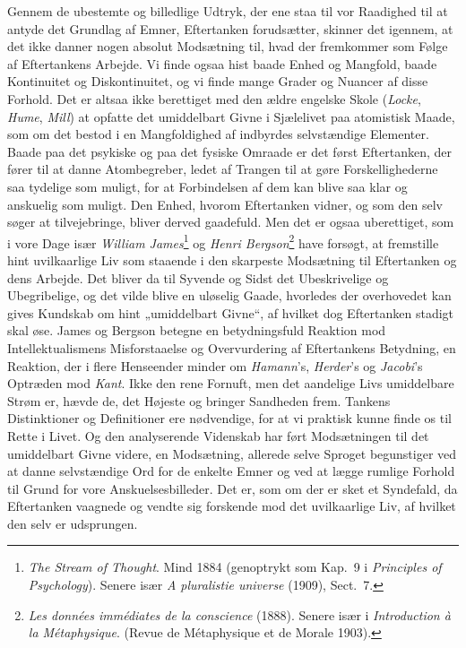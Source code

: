 \documentclass[12pt,a4paper]{book}
\newcommand{\apage}[1]{\marginnote{\footnotesize\textit{[#1]}}}
\begin{document}
\apage{8} Gennem de ubestemte og billedlige Udtryk, der ene staa til vor
Raadighed til at antyde det Grundlag af Emner, Eftertanken
forudsætter, skinner det igennem, at det ikke danner nogen absolut
Modsætning til, hvad der fremkommer som Følge af Eftertankens Arbejde.
Vi finde ogsaa hist baade Enhed og Mangfold, baade Kontinuitet og
Diskontinuitet, og vi finde mange Grader og Nuancer af disse Forhold.
Det er altsaa ikke berettiget med den ældre engelske Skole
(\emph{Locke}, \emph{Hume}, \emph{Mill}) at opfatte det umiddelbart
Givne i Sjælelivet paa atomistisk Maade, som om det bestod i en
Mangfoldighed af indbyrdes selvstændige Elementer. Baade paa det
psykiske og paa det fysiske Omraade er det først Eftertanken, der
fører til at danne Atombegreber, ledet af Trangen til at gøre
Forskellighederne saa tydelige som muligt, for at Forbindelsen af dem
kan blive saa klar og anskuelig som muligt. Den Enhed, hvorom
Eftertanken vidner, og som den selv søger at tilvejebringe, bliver
derved gaadefuld. Men det er ogsaa uberettiget, som i vore Dage især
\emph{William James}\footnote{\emph{The Stream of Thought}. Mind 1884
(genoptrykt som Kap.\ 9 i \emph{Principles of Psychology}). Senere
især \emph{A pluralistie universe} (1909), Sect.\ 7.} og \emph{Henri
Bergson}\footnote{\emph{Les données immédiates de la conscience}
(1888). Senere især i \emph{Introduction à la Métaphysique}. (Revue de
Métaphysique et de Morale 1903).} have forsøgt, at fremstille hint
uvilkaarlige Liv som staaende i den skarpeste Modsætning til
Eftertanken og dens Arbejde. Det bliver da til Syvende og Sidst det
Ubeskrivelige og Ubegribelige, og det vilde blive en uløselig Gaade,
hvorledes der overhovedet kan gives Kundskab om hint „umiddelbart
Givne“, af hvilket dog Eftertanken stadigt skal øse. James og Bergson
betegne en betydningsfuld Reaktion mod Intellektualismens
Misforstaaelse og Overvurdering af Eftertankens Betydning, en
Reaktion, der i flere Henseender minder om \emph{Hamann}’s,
\emph{Herder}’s og \emph{Jacobi}’s Optræden mod \emph{Kant}. Ikke den
rene Fornuft, men det aandelige Livs umiddelbare Strøm er, hævde de,
det Højeste og bringer Sandheden frem. Tankens Distinktioner og
Definitioner ere nødvendige, for at vi praktisk kunne finde os til
Rette i Livet. Og den analyserende Videnskab har ført Modsætningen \apage{9} til
det umiddelbart Givne videre, en Modsætning, allerede selve Sproget
begunstiger ved at danne selvstændige Ord for de enkelte Emner og ved
at lægge rumlige Forhold til Grund for vore Anskuelsesbilleder. Det
er, som om der er sket et Syndefald, da Eftertanken vaagnede og vendte
sig forskende mod det uvilkaarlige Liv, af hvilket den selv er
udsprungen.
\end{document}

